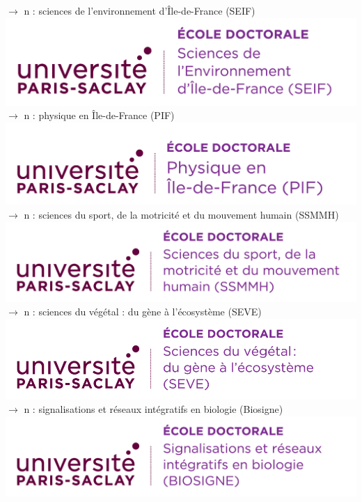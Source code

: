 \documentclass[french,12pt,a4paper]{book}
\begin{document}
\noindent \textbf{\color{Prune}$\rightarrow$} n : sciences de l'environnement d’Île-de-France (SEIF) \\
\includegraphics[scale=.7]{logo_usp_SEIF}\\

\noindent \textbf{\color{Prune}$\rightarrow$} n : physique en Île-de-France (PIF)\\    \includegraphics[scale=.7]{logo_usp_PIF}\\

\noindent \textbf{\color{Prune}$\rightarrow$} n : sciences du sport, de la motricité et du mouvement humain (SSMMH)\\
\includegraphics[scale=.7]{logo_usp_SSMMH}\\
\newpage
\noindent \textbf{\color{Prune}$\rightarrow$} n : sciences du végétal : du gène à l'écosystème (SEVE)\\
\includegraphics[scale=.55]{logo_usp_SEVE}\\

\noindent \textbf{\color{Prune}$\rightarrow$} n : signalisations et réseaux intégratifs en biologie (Biosigne)\\
\includegraphics[scale=.7]{logo_usp_BIOSIGNE}\\
\end{document}
